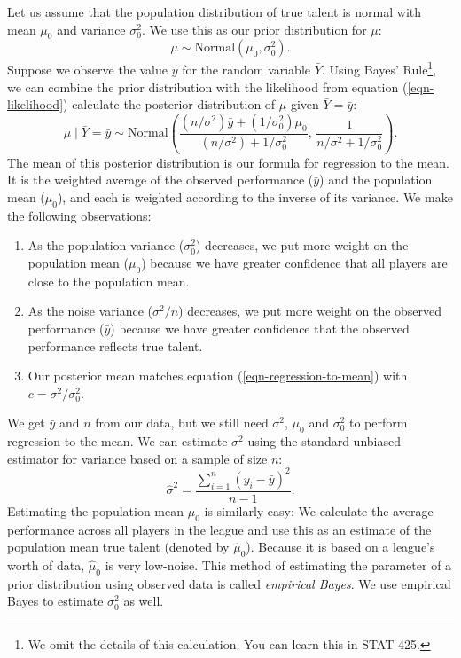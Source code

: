 \documentclass{article}
\begin{document}
    Let us assume that the population distribution of true talent is normal with mean $\mu_0$ and variance $\sigma^2_0$. We use this as our prior distribution for $\mu$:
    \begin{equation*}
      \mu \sim \mbox{Normal}(\mu_0, \sigma^2_0).
    \end{equation*}
    Suppose we observe the value $\bar y$ for the random variable $\bar Y$. Using Bayes' Rule\footnote{We omit the details of this calculation. You can learn this in STAT 425.}, we can combine the prior distribution with the likelihood from equation (\ref{eqn-likelihood}) calculate the posterior distribution of $\mu$ given $\bar Y = \bar y$:
    \begin{equation}
      \label{eqn-posterior}
      \mu \mid \bar Y = \bar y \sim \mbox{Normal}\left(\frac{(n / \sigma^2) \bar y + (1 / \sigma^2_0) \mu_0}{(n / \sigma^2) + 1 / \sigma^2_0},\, \frac{1}{n / \sigma^2 + 1 / \sigma^2_0}\right).
    \end{equation}
    The mean of this posterior distribution is our formula for regression to the mean. It is the weighted average of the observed performance ($\bar y$) and the population mean ($\mu_0$), and each is weighted according to the inverse of its variance. We make the following observations:
    \begin{enumerate}
      \item  As the population variance ($\sigma^2_0$) decreases, we put more weight on the population mean ($\mu_0$) because we have greater confidence that all players are close to the population mean.
      \item As the noise variance ($\sigma^2 / n$) decreases, we put more weight on the observed performance ($\bar y$) because we have greater confidence that the observed performance reflects true talent.
      \item Our posterior mean matches equation (\ref{eqn-regression-to-mean}) with $c = \sigma^2 / \sigma^2_0$.
    \end{enumerate}
  
    We get $\bar y$ and $n$ from our data, but we still need $\sigma^2$, $\mu_0$ and $\sigma^2_0$ to perform regression to the mean. We can estimate $\sigma^2$ using the standard unbiased estimator for variance based on a sample of size $n$:
    \begin{equation}
      \label{eqn-noise-variance}
      \hat \sigma^2 = \frac{\sum_{i = 1}^n (y_i - \bar y)^2}{n - 1}.
    \end{equation}
    Estimating the population mean $\mu_0$ is similarly easy: We calculate the average performance across all players in the league and use this as an estimate of the population mean true talent (denoted by $\hat \mu_0$). Because it is based on a league's worth of data, $\hat \mu_0$ is very low-noise. This method of estimating the parameter of a prior distribution using observed data is called {\it empirical Bayes}. We use empirical Bayes to estimate $\sigma^2_0$ as well.
\end{document}
